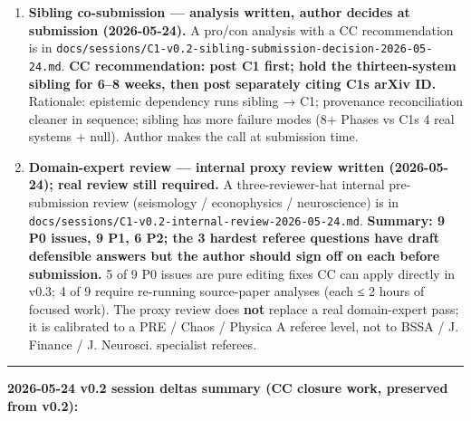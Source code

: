 \documentclass[
  11pt]{article}
\begin{document}
\begin{enumerate}
  numerical one, (iii) reframing the §6.1 qualification in terms of
  which criterion is decisive for an SOC class claim (joint signature vs
  single Vuong test), (iv) adding an explicit falsifier statement for
  Phase 2\textquotesingle s SOC verdict, and (v) adding the historical
  lognormal-vs-power-law econophysics literature context. An
  econophysics-savvy domain expert should still review the framing
  before submission. A separate decision about whether to issue a
  published correction note for the standalone arxiv-02 paper is the
  author\textquotesingle s editorial call.
\item
  \textbf{Sibling co-submission --- analysis written, author decides at
  submission (2026-05-24).} A pro/con analysis with a CC recommendation
  is in
  \texttt{docs/sessions/C1-v0.2-sibling-submission-decision-2026-05-24.md}.
  \textbf{CC recommendation: post C1 first; hold the thirteen-system
  sibling for 6--8 weeks, then post separately citing
  C1\textquotesingle s arXiv ID.} Rationale: epistemic dependency runs
  sibling → C1; provenance reconciliation cleaner in sequence; sibling
  has more failure modes (8+ Phases vs C1\textquotesingle s 4 real
  systems + null). Author makes the call at submission time.
\item
  \textbf{Domain-expert review --- internal proxy review written
  (2026-05-24); real review still required.} A three-reviewer-hat
  internal pre-submission review (seismology / econophysics /
  neuroscience) is in
  \texttt{docs/sessions/C1-v0.2-internal-review-2026-05-24.md}.
  \textbf{Summary: 9 P0 issues, 9 P1, 6 P2; the 3 hardest referee
  questions have draft defensible answers but the author should sign off
  on each before submission.} 5 of 9 P0 issues are pure editing fixes CC
  can apply directly in v0.3; 4 of 9 require re-running source-paper
  analyses (each ≤ 2 hours of focused work). The proxy review does
  \textbf{not} replace a real domain-expert pass; it is calibrated to a
  PRE / Chaos / Physica A referee level, not to BSSA / J. Finance / J.
  Neurosci. specialist referees.
\end{enumerate}

\begin{center}\rule{0.5\linewidth}{0.5pt}\end{center}

\textbf{2026-05-24 v0.2 session deltas summary (CC closure work,
preserved from v0.2):}
\end{document}
